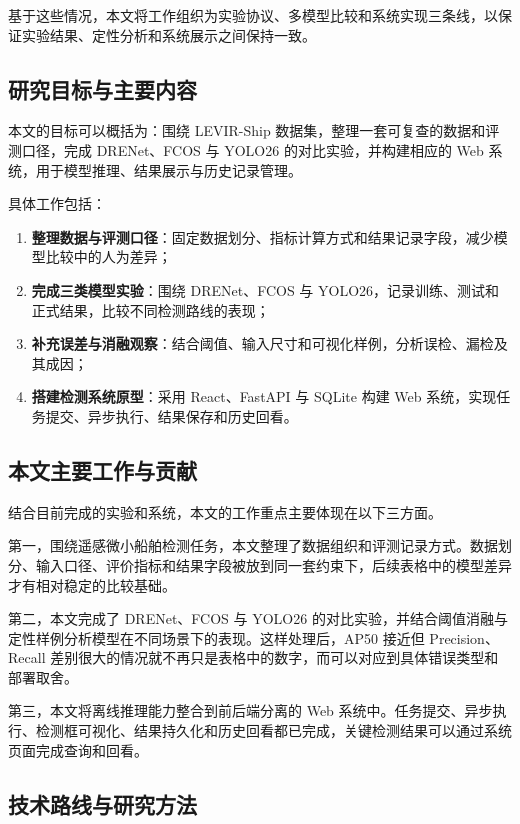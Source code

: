 基于这些情况，本文将工作组织为实验协议、多模型比较和系统实现三条线，以保证实验结果、定性分析和系统展示之间保持一致。

\subsection{研究目标与主要内容}

本文的目标可以概括为：围绕 LEVIR-Ship 数据集，整理一套可复查的数据和评测口径，完成 DRENet、FCOS 与 YOLO26 的对比实验，并构建相应的 Web 系统，用于模型推理、结果展示与历史记录管理。

具体工作包括：

\begin{enumerate}
      \item \textbf{整理数据与评测口径}：固定数据划分、指标计算方式和结果记录字段，减少模型比较中的人为差异；
      \item \textbf{完成三类模型实验}：围绕 DRENet、FCOS 与 YOLO26，记录训练、测试和正式结果，比较不同检测路线的表现；
      \item \textbf{补充误差与消融观察}：结合阈值、输入尺寸和可视化样例，分析误检、漏检及其成因；
      \item \textbf{搭建检测系统原型}：采用 React、FastAPI 与 SQLite 构建 Web 系统，实现任务提交、异步执行、结果保存和历史回看。
\end{enumerate}

\subsection{本文主要工作与贡献}

结合目前完成的实验和系统，本文的工作重点主要体现在以下三方面。

第一，围绕遥感微小船舶检测任务，本文整理了数据组织和评测记录方式。数据划分、输入口径、评价指标和结果字段被放到同一套约束下，后续表格中的模型差异才有相对稳定的比较基础。

第二，本文完成了 DRENet、FCOS 与 YOLO26 的对比实验，并结合阈值消融与定性样例分析模型在不同场景下的表现。这样处理后，AP50 接近但 Precision、Recall 差别很大的情况就不再只是表格中的数字，而可以对应到具体错误类型和部署取舍。

第三，本文将离线推理能力整合到前后端分离的 Web 系统中。任务提交、异步执行、检测框可视化、结果持久化和历史回看都已完成，关键检测结果可以通过系统页面完成查询和回看。

\subsection{技术路线与研究方法}

